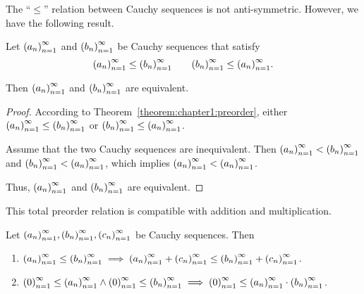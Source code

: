The ``$\le$'' relation between Cauchy sequences is not anti-symmetric. However, we have the following result.

\begin{theorem}\label{theorem:chapter1:weak-anti-symmetry}
    Let $\seq{a_{n}}$ and $\seq{b_{n}}$ be Cauchy sequences that satisfy
    \[
        \seq{a_{n}}\le\seq{b_{n}}\qquad\seq{b_{n}}\le\seq{a_{n}}.
    \]

    Then $\seq{a_{n}}$ and $\seq{b_{n}}$ are equivalent.
\end{theorem}

\begin{proof}
    According to Theorem~\ref{theorem:chapter1:preorder}, either $\seq{a_{n}}\le\seq{b_{n}}$ or $\seq{b_{n}}\le\seq{a_{n}}$.

    Assume that the two Cauchy sequences are inequivalent. Then $\seq{a_{n}} < \seq{b_{n}}$ and $\seq{b_{n}} < \seq{a_{n}}$, which implies $\seq{a_{n}} < \seq{a_{n}}$.

    Thus, $\seq{a_{n}}$ and $\seq{b_{n}}$ are equivalent.
\end{proof}

This total preorder relation is compatible with addition and multiplication.

\begin{theorem}\label{theorem:chapter1:cauchy-sequence-order-compatibility-with-addition-and-mulitplication}
    Let $\seq{a_{n}}, \seq{b_{n}}, \seq{c_{n}}$ be Cauchy sequences. Then
    \begin{enumerate}[label={(\roman*)}]
        \item $\seq{a_{n}}\le\seq{b_{n}}\implies\seq{a_{n}}+\seq{c_{n}}\le\seq{b_{n}}+\seq{c_{n}}$.
        \item $\seq{0}\le\seq{a_{n}}\land\seq{0}\le\seq{b_{n}}\implies\seq{0}\le\seq{a_{n}}\cdot\seq{b_{n}}$.
    \end{enumerate}
\end{theorem}


